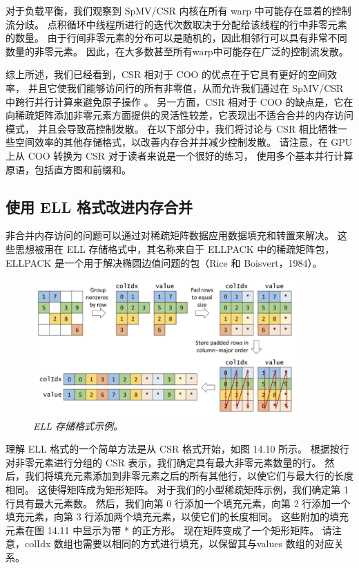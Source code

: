 对于负载平衡，我们观察到 SpMV/CSR 内核在所有 warp 中可能存在显着的控制流分歧。 
点积循环中线程所进行的迭代次数取决于分配给该线程的行中非零元素的数量。 由于行间非零元素的分布可以是随机的，因此相邻行可以具有非常不同数量的非零元素。 因此，在大多数甚至所有warp中可能存在广泛的控制流发散。

综上所述，我们已经看到，CSR 相对于 COO 的优点在于它具有更好的空间效率，
并且它使我们能够访问行的所有非零值，从而允许我们通过在 SpMV/CSR 中跨行并行计算来避免原子操作 。 
另一方面，CSR 相对于 COO 的缺点是，它在向稀疏矩阵添加非零元素方面提供的灵活性较差，它表现出不适合合并的内存访问模式，
并且会导致高控制发散。 在以下部分中，我们将讨论与 CSR 相比牺牲一些空间效率的其他存储格式，以改善内存合并并减少控制发散。 
请注意，在 GPU 上从 $\mathrm{COO}$ 转换为 CSR 对于读者来说是一个很好的练习，
使用多个基本并行计算原语，包括直方图和前缀和。

\subsection{使用 ELL 格式改进内存合并}
非合并内存访问的问题可以通过对稀疏矩阵数据应用数据填充和转置来解决。 
这些思想被用在 ELL 存储格式中，其名称来自于 ELLPACK 中的稀疏矩阵包，
ELLPACK 是一个用于解决椭圆边值问题的包（Rice 和 Boisvert，1984）。

\begin{figure}[H]
	\centering
	\includegraphics[width=0.9\textwidth]{figs/F14.10.png}
	\caption{\textit{ELL 存储格式示例。}}
\end{figure}

理解 ELL 格式的一个简单方法是从 CSR 格式开始，如图 14.10 所示。 
根据按行对非零元素进行分组的 CSR 表示，我们确定具有最大非零元素数量的行。 
然后，我们将填充元素添加到非零元素之后的所有其他行，以使它们与最大行的长度相同。 这使得矩阵成为矩形矩阵。 
对于我们的小型稀疏矩阵示例，我们确定第 1 行具有最大元素数。 
然后，我们向第 0 行添加一个填充元素，向第 2 行添加一个填充元素，向第 3 行添加两个填充元素，以使它们的长度相同。 
这些附加的填充元素在图 14.11 中显示为带 * 的正方形。 现在矩阵变成了一个矩形矩阵。 
请注意，colIdx 数组也需要以相同的方式进行填充，以保留其与values 数组的对应关系。

